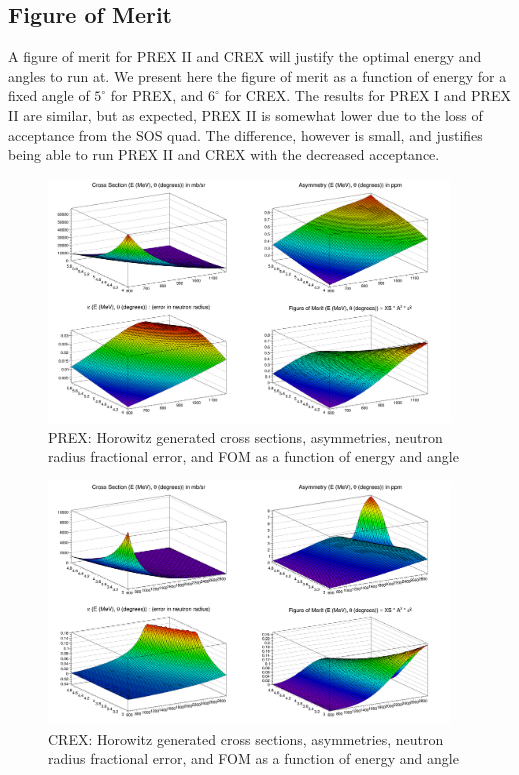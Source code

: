 \documentclass[11pt]{amsart}
\begin{document}
\subsection{ Figure of Merit }

A figure of merit for PREX II and CREX will justify the optimal energy and angles to run at. We present here the figure of merit as a function of energy for a fixed angle of $5^\circ$ for PREX, and $6^\circ$ for CREX. The results for PREX I and PREX II are similar, but as expected, PREX II is somewhat lower due to the loss of acceptance from the SOS quad. The difference, however is small, and justifies being able to run PREX II and CREX with the decreased acceptance.

\FloatBarrier
\begin{figure}
  \includegraphics[width=0.95\textwidth]{plots/contour_p.png}
  \caption{PREX: Horowitz generated cross sections, asymmetries, neutron radius fractional error, and FOM as a function of energy and angle}
\end{figure}

\begin{figure}
  \includegraphics[width=0.95\textwidth]{plots/contour_c.png}
  \caption{CREX: Horowitz generated cross sections, asymmetries, neutron radius fractional error, and FOM as a function of energy and angle}
\end{figure}
\end{document}
